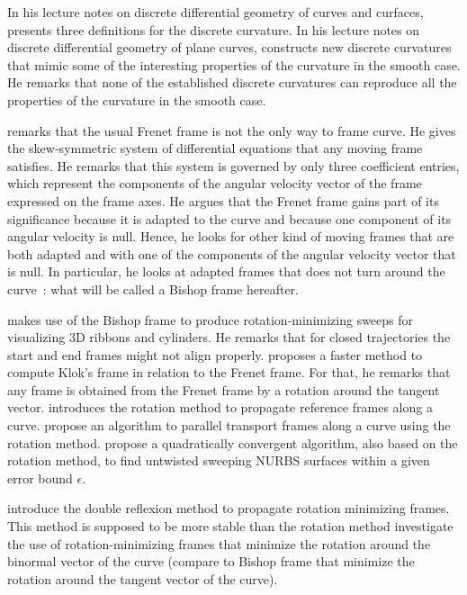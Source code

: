 In his lecture notes on discrete differential geometry of curves and curfaces,  presents three definitions for the discrete curvature. In his lecture notes on discrete differential geometry of plane curves,  constructs new discrete curvatures that mimic some of the interesting properties of the curvature in the smooth case. He remarks that none of the established discrete curvatures can reproduce all the properties of the curvature in the smooth case.

 remarks that the usual Frenet frame is not the only way to frame curve. He gives the skew-symmetric system of differential equations that any moving frame satisfies. He remarks that this system is governed by only three coefficient entries, which represent the components of the angular velocity vector of the frame expressed on the frame axes. He argues that the Frenet frame gains part of its significance because it is adapted to the curve and because one component of its angular velocity is null. Hence, he looks for other kind of moving frames that are both adapted and with one of the components of the angular velocity vector that is null. In particular, he looks at adapted frames that does not turn around the curve~: what will be called a Bishop frame hereafter.

 makes use of the Bishop frame to produce rotation-minimizing sweeps for visualizing 3D ribbons and cylinders. He remarks that for closed trajectories the start and end frames might not align properly.  proposes a faster method to compute Klok's frame in relation to the Frenet frame. For that, he remarks that any frame is obtained from the Frenet frame by a rotation around the tangent vector.  introduces the rotation method to propagate reference frames along a curve.  propose an algorithm to parallel transport frames along a curve using the rotation method.  propose a quadratically convergent algorithm, also based on the rotation method, to find untwisted sweeping NURBS surfaces within a given error bound $\epsilon$. 

 introduce the double reflexion method to propagate rotation minimizing frames. This method is supposed to be more stable than the rotation method
 investigate the use of rotation-minimizing frames that minimize the rotation around the binormal vector of the curve (compare to Bishop frame that minimize the rotation around the tangent vector of the curve).



